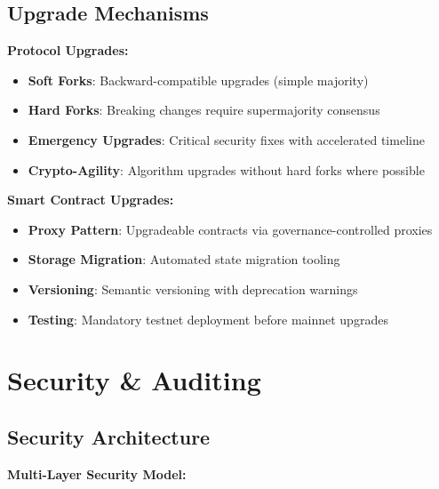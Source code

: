 \documentclass[11pt,a4paper]{scrartcl}
\begin{document}
\subsection{Upgrade Mechanisms}

\textbf{Protocol Upgrades:}
\begin{itemize}
\item \textbf{Soft Forks}: Backward-compatible upgrades (simple majority)
\item \textbf{Hard Forks}: Breaking changes require supermajority consensus
\item \textbf{Emergency Upgrades}: Critical security fixes with accelerated timeline
\item \textbf{Crypto-Agility}: Algorithm upgrades without hard forks where possible
\end{itemize}

\textbf{Smart Contract Upgrades:}
\begin{itemize}
\item \textbf{Proxy Pattern}: Upgradeable contracts via governance-controlled proxies
\item \textbf{Storage Migration}: Automated state migration tooling
\item \textbf{Versioning}: Semantic versioning with deprecation warnings
\item \textbf{Testing}: Mandatory testnet deployment before mainnet upgrades
\end{itemize}

\newpage

\section{Security \& Auditing}

\subsection{Security Architecture}

\textbf{Multi-Layer Security Model:}
\end{document}

